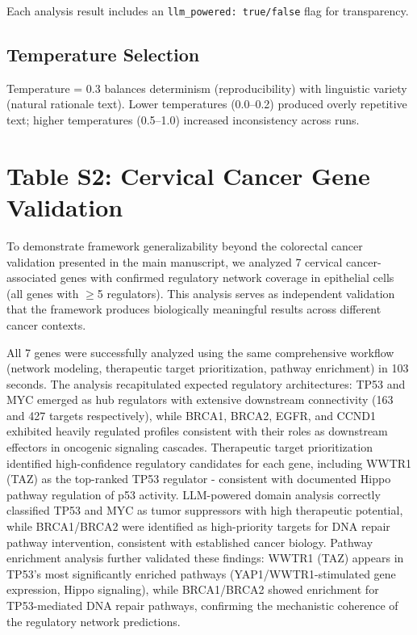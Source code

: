 \documentclass[11pt]{article}
\begin{document}
Each analysis result includes an \texttt{llm\_powered: true/false} flag for transparency.

\subsection{Temperature Selection}

Temperature = 0.3 balances determinism (reproducibility) with linguistic variety (natural rationale text). Lower temperatures (0.0--0.2) produced overly repetitive text; higher temperatures (0.5--1.0) increased inconsistency across runs.

\section{Table S2: Cervical Cancer Gene Validation}

To demonstrate framework generalizability beyond the colorectal cancer validation presented in the main manuscript, we analyzed 7 cervical cancer-associated genes with confirmed regulatory network coverage in epithelial cells (all genes with $\geq$5 regulators). This analysis serves as independent validation that the framework produces biologically meaningful results across different cancer contexts.

All 7 genes were successfully analyzed using the same comprehensive workflow (network modeling, therapeutic target prioritization, pathway enrichment) in 103 seconds. The analysis recapitulated expected regulatory architectures: TP53 and MYC emerged as hub regulators with extensive downstream connectivity (163 and 427 targets respectively), while BRCA1, BRCA2, EGFR, and CCND1 exhibited heavily regulated profiles consistent with their roles as downstream effectors in oncogenic signaling cascades. Therapeutic target prioritization identified high-confidence regulatory candidates for each gene, including WWTR1 (TAZ) as the top-ranked TP53 regulator - consistent with documented Hippo pathway regulation of p53 activity. LLM-powered domain analysis correctly classified TP53 and MYC as tumor suppressors with high therapeutic potential, while BRCA1/BRCA2 were identified as high-priority targets for DNA repair pathway intervention, consistent with established cancer biology. Pathway enrichment analysis further validated these findings: WWTR1 (TAZ) appears in TP53's most significantly enriched pathways (YAP1/WWTR1-stimulated gene expression, Hippo signaling), while BRCA1/BRCA2 showed enrichment for TP53-mediated DNA repair pathways, confirming the mechanistic coherence of the regulatory network predictions.
\end{document}
